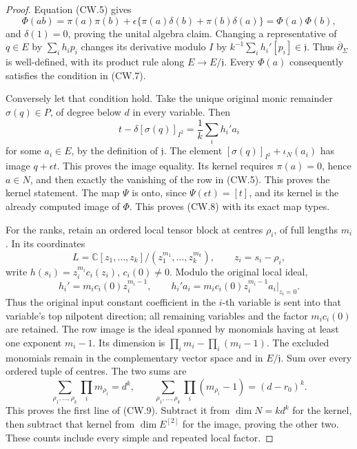 \begin{proof}
Equation (CW.5) gives
\[
 \Phi(ab)=\pi(a)\pi(b)+
       \epsilon\{\pi(a)\delta(b)+\pi(b)\delta(a)\}
          =\Phi(a)\Phi(b),
\]
and \(\delta(1)=0\), proving the unital algebra claim.
Changing a representative of \(q\in E\) by \(\sum_i h_ip_i\)
changes its derivative modulo \(I\) by
\(k^{-1}\sum_i h_i'[p_i]\in\mathfrak j\).
Thus \(\overline\partial_\Sigma\) is well-defined, with its
product rule along \(E\to E/\mathfrak j\).
Every \(\Phi(a)\) consequently satisfies the condition in
(CW.7).

Conversely let that condition hold.  Take the unique original
monic remainder \(\sigma(q)\in P\), of degree below \(d\)
in every variable.  Then
\[
 t-\delta[\sigma(q)]_{I^2}
             =\frac1k\sum_i h_i'a_i
\]
for some \(a_i\in E\), by the definition of \(\mathfrak j\).
The element
\([\sigma(q)]_{I^2}+\iota_N(a_i)\) has image \(q+\epsilon t\).
This proves the image equality.  Its kernel requires
\(\pi(a)=0\), hence \(a\in N\), and then exactly the vanishing
of the row in (CW.5).  This proves the kernel statement.
The map \(\Psi\) is onto, since \(\Psi(\epsilon t)=[t]\),
and its kernel is the already computed image of \(\Phi\).
This proves (CW.8) with its exact map types.

For the ranks, retain an ordered local tensor block at centres
\(\rho_i\), of full lengths \(m_i\).  In its coordinates
\[
 L=\mathbb C[z_1,\ldots,z_k]/(z_1^{m_1},\ldots,z_k^{m_k}),
 \qquad z_i=s_i-\rho_i,
\]
write \(h(s_i)=z_i^{m_i}c_i(z_i)\), \(c_i(0)\ne0\).
Modulo the original local ideal,
\[
 h_i'=m_ic_i(0)z_i^{m_i-1},\qquad
 h_i'a_i=m_ic_i(0)z_i^{m_i-1}
                      a_i|_{z_i=0}.
 \tag{CW.10}
\]
Thus the original input constant coefficient in the \(i\)-th
variable is sent into that variable's top nilpotent direction;
all remaining variables and the factor \(m_ic_i(0)\) are retained.
The row image is the ideal spanned by monomials having at
least one exponent \(m_i-1\).  Its dimension is
\(\prod_i m_i-\prod_i(m_i-1)\).
The excluded monomials remain in the complementary vector
space and in \(E/\mathfrak j\).
Sum over every ordered tuple of centres.  The two sums are
\[
 \sum_{\rho_1,\ldots,\rho_k}\prod_i m_{\rho_i}=d^k,\qquad
 \sum_{\rho_1,\ldots,\rho_k}\prod_i(m_{\rho_i}-1)
                                  =(d-r_0)^k .
 \tag{CW.11}
\]
This proves the first line of (CW.9).  Subtract it from
\(\dim N=kd^k\) for the kernel, then subtract that kernel
from \(\dim E^{[2]}\) for the image, proving the other two.
These counts include every simple and repeated local factor.
\end{proof}

